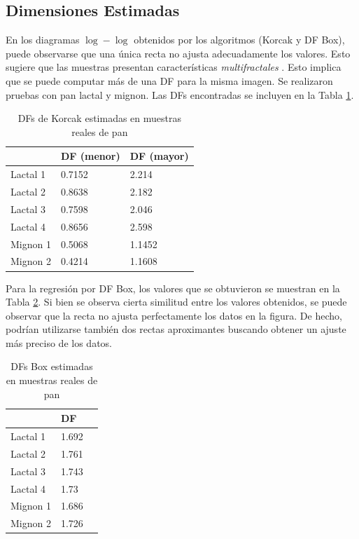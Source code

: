 \subsection{Dimensiones Estimadas}

En los diagramas $\log-\log $ obtenidos por los algoritmos (Korcak y DF Box), puede observarse que una \'unica recta no ajusta adecuadamente los valores. Esto sugiere que las muestras presentan caracter\'isticas {\em multifractales} \cite{Mandelbrot1989}.
Esto implica que se puede computar m\'as de una DF para la misma imagen. Se realizaron pruebas con pan lactal y mignon. Las DFs encontradas se incluyen en la Tabla \ref{tab:korcak}.

\begin{table}
\center
\begin{tabular}{|| l | l | l ||}
    \hline
     & DF (menor) & DF (mayor) \\    
    \hline
    Lactal 1 & 0.7152 & 2.214 \\
    \hline
    Lactal 2 & 0.8638 & 2.182 \\
    \hline
    Lactal 3 & 0.7598 & 2.046 \\
    \hline
    Lactal 4 & 0.8656 & 2.598 \\
    \hline
    Mignon 1 & 0.5068 & 1.1452\\
    \hline
    Mignon 2 & 0.4214 & 1.1608\\
    \hline
\end{tabular}
\caption{DFs de Korcak estimadas en muestras reales de pan}
\label{tab:korcak}
\end{table}

Para la regresi\'on por DF Box, los valores que se obtuvieron se muestran en la Tabla \ref{tab:box}.
Si bien se observa cierta similitud entre los valores obtenidos, se puede observar que la recta no ajusta perfectamente los datos en la figura.
De hecho, podrían utilizarse también dos rectas aproximantes buscando obtener un ajuste más preciso de los datos.

\begin{table}
\begin{center}
\begin{tabular}{|| l | l | l ||}
    \hline
     & DF \\    
    \hline
    Lactal 1 & 1.692 \\
    \hline
    Lactal 2 & 1.761 \\
    \hline
    Lactal 3 & 1.743\\
    \hline
    Lactal 4 & 1.73 \\
    \hline
    Mignon 1 & 1.686 \\
    \hline
    Mignon 2 & 1.726 \\
    \hline
\end{tabular}
\caption{DFs Box estimadas en muestras reales de pan}
\label{tab:box}
\end{center}
\end{table}

